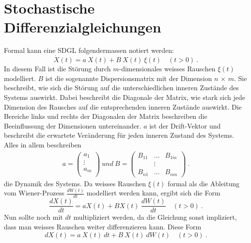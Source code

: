 %
%
%
%

\section{Stochastische Differenzialgleichungen\label{brown:SDGL}}

Formal kann eine SDGL folgendermassen notiert werden: 
\begin{equation}
	\label{brown:SDGL:whiteNoise}
	\dot{X}(t) = a \ X(t) + B \ X(t) \ \xi(t) \quad (t>0) \ .
\end{equation}
In diesem Fall ist die Störung durch $ m $-dimensionales weisses Rauschen $ \xi(t) $ modelliert. $ B $ ist die sogenannte Dispersionsmatrix mit der Dimension $ n $ $\times $ $ m $. Sie beschreibt, wie sich die Störung auf die unterschiedlichen inneren Zustände des Systems auswirkt. Dabei beschreibt die Diagonale der Matrix, wie stark sich jede Dimension des Rausches auf die entsprechenden inneren Zustände auswirkt. Die Bereiche links und rechts der Diagonalen der Matrix beschreiben die Beeinflussung der Dimensionen untereinander. $ a $ ist der Drift-Vektor und beschreibt die erwartete Veränderung für jeden inneren Zustand des Systems. Alles in allem beschreiben
\begin{align*}
	a = 
	\begin{pmatrix}
		a_{1} \\
		\vdots \\
		a_{m}\\ 
	\end{pmatrix}
	\ und \
	B = 
	\begin{pmatrix}
		B_{11} & \dots & B_{1m} \\
		& \vdots & \\
		B_{n1} & \dots & B_{nm} 
	\end{pmatrix} \ .
\end{align*}
die Dynamik des Systems. Da weisses Rauschen $ \xi(t) $ formal als die Ableitung vom Wiener-Prozess $ \frac{dW(t)}{dt} $ modelliert werden kann, ergibt sich die Form
\begin{equation}
	\frac{dX(t)}{dt} = aX(t) + BX(t) \ \frac{dW(t)}{dt} \quad (t>0) \ .
\end{equation}
Nun sollte noch mit $ dt $  multipliziert werden, da die Gleichung sonst impliziert, dass man weisses Rauschen weiter differenzieren kann. Diese Form
\begin{equation}
	dX(t) = a \ X(t) \ dt + B \ X(t) \ dW(t) \quad (t>0) \ .
\end{equation}
